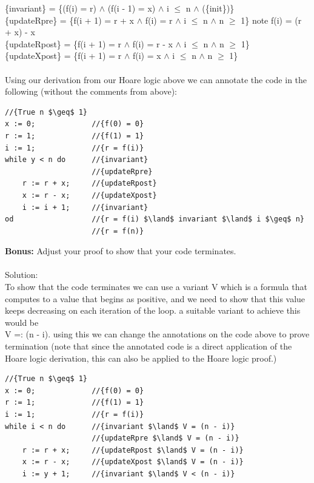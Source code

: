 \documentclass{article}
\newcommand*\moveToRight[1]{\hspace*{0em plus 1fill}\makebox{(#1)}}
\begin{document}
\begin{enumerate}[(a)]
    \{invariant\} = \{(f(i) = r) $\land$ (f(i - 1) = x) $\land$ i $\leq$ n $\land$ (\{init\})\}\\
    \{updateRpre\} = \{f(i + 1) = r + x $\land$ f(i) = r $\land$ i $\leq$ n $\land$ n $\geq$ 1\} note f(i) = (r + x) - x\\
    \{updateRpost\} =  \{f(i + 1) = r $\land$ f(i) = r - x $\land$ i  $\leq$ n $\land$ n $\geq$ 1\}\\
    \{updateXpost\} =  \{f(i + 1) = r $\land$ f(i) = x $\land$  i $\leq$ n $\land$ n $\geq$ 1\}\\\\  
    Using our derivation from our Hoare logic above we can annotate the code in the following (without the comments from above):\\
\begin{lstlisting}[language=Maple,mathescape=true]
                    //{True n $\geq$ 1}
x := 0;             //{f(0) = 0}
r := 1;             //{f(1) = 1}
i := 1;             //{r = f(i)}
while y < n do      //{invariant}
                    //{updateRpre}
    r := r + x;     //{updateRpost}
    x := r - x;     //{updateXpost} 
    i := i + 1;     //{invariant}
od                  //{r = f(i) $\land$ invariant $\land$ i $\geq$ n}
                    //{r = f(n)}
    \end{lstlisting}
    \textbf{Bonus:} Adjust your proof to show that your code terminates. \moveToRight{3* marks}\\\\
    Solution:\\
    To show that the code terminates we can use a variant V which is a formula that computes to a value that begins as positive, and we need to show that this value keeps decreasing on each iteration of the loop. a suitable variant to achieve this would be\\ V =: (n - i). using this we can change the annotations on the code above to prove termination (note that since the annotated code is a direct application of the Hoare logic derivation, this can also be applied to the Hoare logic proof.)
\begin{lstlisting}[language=Maple,mathescape=true]
                    //{True n $\geq$ 1}
x := 0;             //{f(0) = 0}
r := 1;             //{f(1) = 1}
i := 1;             //{r = f(i)}
while i < n do      //{invariant $\land$ V = (n - i)}
                    //{updateRpre $\land$ V = (n - i)}
    r := r + x;     //{updateRpost $\land$ V = (n - i)}
    x := r - x;     //{updateXpost $\land$ V = (n - i)} 
    i := y + 1;     //{invariant $\land$ V < (n - i)}

\end{lstlisting}
\end{enumerate}
\end{document}
